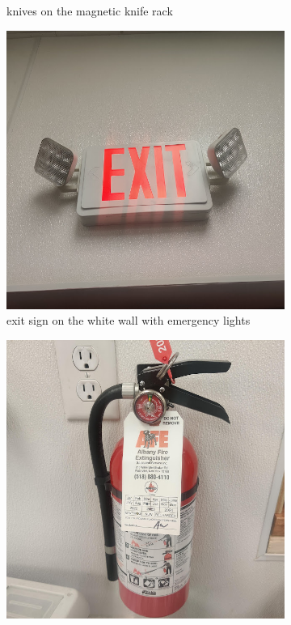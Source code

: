 \documentclass[]{article}
\begin{document}
\begin{figure}[h]
\begin{subfigure}[b]{0.2\textwidth}
        \caption{knives on the magnetic knife rack}
    \end{subfigure}
    \begin{subfigure}[b]{0.2\textwidth}
        \centering
        \includegraphics[width=\textwidth]{dataset/2.jpg}
        \caption{exit sign on the white wall with emergency lights}
    \end{subfigure}
    \begin{subfigure}[b]{0.2\textwidth}
        \centering
        \includegraphics[width=\textwidth]{dataset/3.jpg}

\end{subfigure}
\end{figure}
\end{document}
